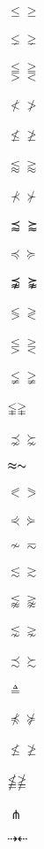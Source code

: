 \documentclass{article}
\begin{document}
$\leqslant \geqslant $\\\\
$\lneq \gneq $\\\\
$\lesseqqgtr \gtreqqless $\\\\
$\nless \ngtr $\\\\
$\nleq \ngeq $\\\\
$\lessapprox \gtrapprox $\\\\
$\nprec \nsucc $\\\\
$\precapprox \succapprox $\\\\
$\preccurlyeq \succcurlyeq $\\\\
$\precnapprox \succnapprox $\\\\
$\lessgtr \gtrless $\\\\
$\lesseqgtr \gtreqless $\\\\
$\lneqq \gneqq $\\\\
$\lvertneqq \gvertneqq $\\\\
$\precnsim \succnsim $\\\\
$\thickapprox \thicksim$\\\\
$\eqslantless \eqslantgtr $\\\\
$\curlyeqprec \curlyeqsucc $\\\\
$\nsim \eqsim $\\\\
$\lesssim \gtrsim $\\\\
$\lnapprox \gnapprox $\\\\
$\lnsim \gnsim $\\\\
$\precsim \succsim $\\\\
$\triangleq $\\\\
$\npreceq \nsucceq $\\\\
$\nleqslant \ngeqslant $\\\\
$\nleqq \ngeqq $\\\\
$\pitchfork$\\\\
$\dashrightarrow \dashleftarrow$\\\\
\end{document}
